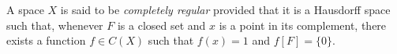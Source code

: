 A space $X$ is said to be \emph{completely regular} provided that it is a Hausdorff space such that, whenever $F$ is a closed set and $x$ is a point in its complement, there exists a function $f \in C(X)$ such that $f(x) = 1$ and $f[F] = \{0\}$.
